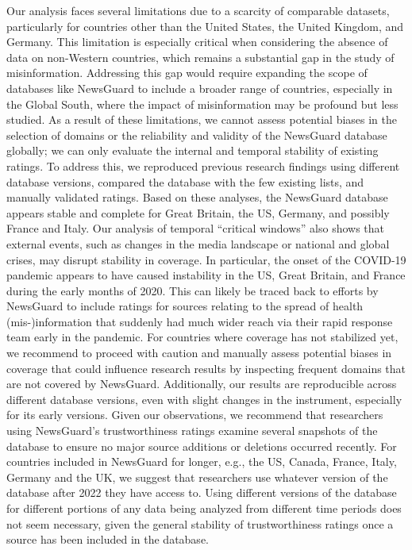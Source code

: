 \documentclass[12pt,twoside]{article}
\begin{document}
Our analysis faces several limitations due to a scarcity of comparable datasets, particularly for countries other than the United States, the United Kingdom, and Germany. 
This limitation is especially critical when considering the absence of data on non-Western countries, which remains a substantial gap in the study of misinformation.
Addressing this gap would require expanding the scope of databases like NewsGuard to include a broader range of countries, especially in the Global South, where the impact of misinformation may be profound but less studied.
As a result of these limitations, we cannot assess potential biases in the selection of domains or the reliability and validity of the NewsGuard database globally; we can only evaluate the internal and temporal stability of existing ratings. 
To address this, we reproduced previous research findings using different database versions, compared the database with the few existing lists, and manually validated ratings. 
Based on these analyses, the NewsGuard database appears stable and complete for Great Britain, the US, Germany, and possibly France and Italy. 
Our analysis of temporal ``critical windows'' also shows that external events, such as changes in the media landscape or national and global crises, may disrupt stability in coverage. 
In particular, the onset of the COVID-19 pandemic appears to have caused instability in the US, Great Britain, and France during the early months of 2020. 
This can likely be traced back to efforts by NewsGuard to include ratings for sources relating to the spread of health (mis-)information that suddenly had much wider reach via their rapid response team early in the pandemic. 
For countries where coverage has not stabilized yet, we recommend to proceed with caution and manually assess potential biases in coverage that could influence research results by inspecting frequent domains that are not covered by NewsGuard. 
Additionally, our results are reproducible across different database versions, even with slight changes in the instrument, especially for its early versions.
Given our observations, we recommend that researchers using NewsGuard's trustworthiness ratings examine several snapshots of the database to ensure no major source additions or deletions occurred recently. 
For countries included in NewsGuard for longer, e.g., the US, Canada, France, Italy, Germany and the UK, we suggest that researchers use whatever version of the database after 2022 they have access to.
Using different versions of the database for different portions of any data being analyzed from different time periods does not seem necessary, given the general stability of trustworthiness ratings once a source has been included in the database.
\end{document}
